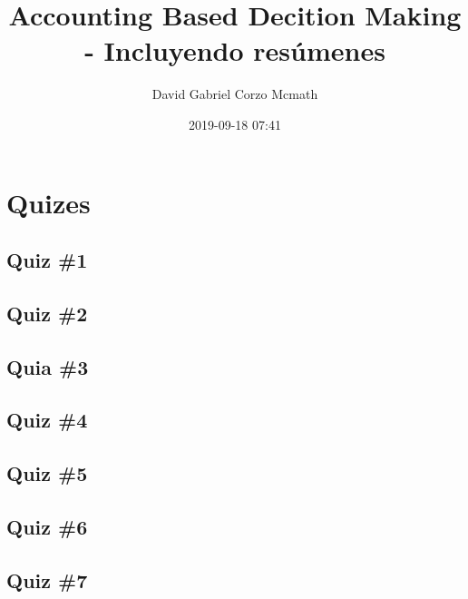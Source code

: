 \documentclass{book}
\author{David Gabriel Corzo Mcmath}
\title{Accounting Based Decition Making - Incluyendo resúmenes}
\date{2019-09-18 07:41}
\begin{document}
\maketitle
\tableofcontents

\part{Quizes}
\chapter{Quiz \#1}


\chapter{Quiz \#2}


\chapter{Quia \#3}


\chapter{Quiz \#4}


\chapter{Quiz \#5}


\chapter{Quiz \#6}


\chapter{Quiz \#7}

\end{document}
